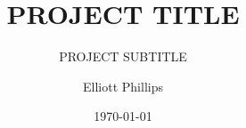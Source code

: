 \title{PROJECT TITLE}
\subtitle{PROJECT SUBTITLE}
\author{Elliott Phillips}
\date{\today}

\frontpage

{ %
	\makeatletter
		\@twosidetrue
		\@openrighttrue
	\makeatother
	
	\ifodd\thepage\relax\else\blankpage\fi
	
	\tableofcontents
	\newpage
	\ifodd\thepage\relax\else\blankpage\fi
	
	
	\setcounter{page}{1}
}